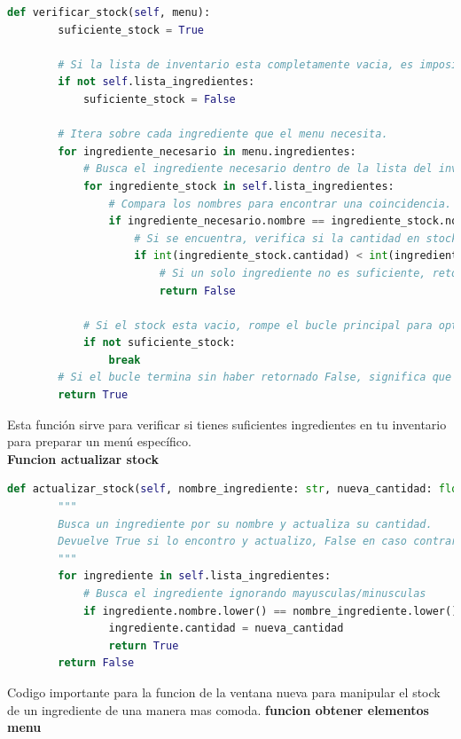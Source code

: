 \documentclass[a4paper,12pt]{article}
\begin{document}
\begin{lstlisting}[language=Python, caption={Cambio de codigo}, frame=single]
def verificar_stock(self, menu):
        suficiente_stock = True
    
        # Si la lista de inventario esta completamente vacia, es imposible preparar algo.
        if not self.lista_ingredientes:
            suficiente_stock = False

        # Itera sobre cada ingrediente que el menu necesita.
        for ingrediente_necesario in menu.ingredientes:
            # Busca el ingrediente necesario dentro de la lista del inventario.
            for ingrediente_stock in self.lista_ingredientes:
                # Compara los nombres para encontrar una coincidencia.
                if ingrediente_necesario.nombre == ingrediente_stock.nombre:
                    # Si se encuentra, verifica si la cantidad en stock es menor a la requerida.
                    if int(ingrediente_stock.cantidad) < int(ingrediente_necesario.cantidad):
                        # Si un solo ingrediente no es suficiente, retorna False inmediatamente.
                        return False
        
            # Si el stock esta vacio, rompe el bucle principal para optimizar.
            if not suficiente_stock:
                break
        # Si el bucle termina sin haber retornado False, significa que todos los ingredientes estan disponibles.
        return True
\end{lstlisting}
Esta función sirve para verificar si tienes suficientes ingredientes en tu inventario para preparar un menú específico.\\
\textbf{Funcion actualizar stock}
\begin{lstlisting}[language=Python, caption={Cambio de codigo}, frame=single]
    def actualizar_stock(self, nombre_ingrediente: str, nueva_cantidad: float):
        """
        Busca un ingrediente por su nombre y actualiza su cantidad.
        Devuelve True si lo encontro y actualizo, False en caso contrario.
        """
        for ingrediente in self.lista_ingredientes:
            # Busca el ingrediente ignorando mayusculas/minusculas
            if ingrediente.nombre.lower() == nombre_ingrediente.lower():
                ingrediente.cantidad = nueva_cantidad
                return True  
        return False 
\end{lstlisting}
Codigo importante para la funcion de la ventana nueva para manipular el stock de un ingrediente de una manera mas comoda.
\newpage
\textbf{funcion obtener elementos menu}
\end{document}
